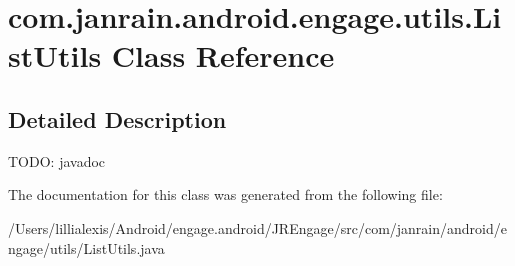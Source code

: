 \hypertarget{classcom_1_1janrain_1_1android_1_1engage_1_1utils_1_1_list_utils}{
\section{com.janrain.android.engage.utils.ListUtils Class Reference}
\label{classcom_1_1janrain_1_1android_1_1engage_1_1utils_1_1_list_utils}
}


\subsection{Detailed Description}
TODO: javadoc 

The documentation for this class was generated from the following file:\begin{DoxyCompactItemize}
\item 
/Users/lillialexis/Android/engage.android/JREngage/src/com/janrain/android/engage/utils/ListUtils.java\end{DoxyCompactItemize}
